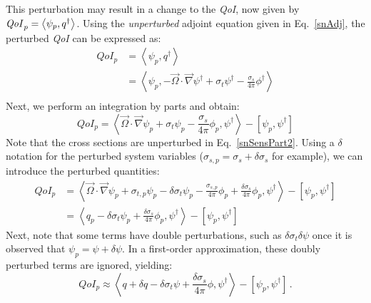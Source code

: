 \documentclass[12pt]{report}
\newcommand{\vO}{\vec{\Omega}}
\newcommand{\bra}{\left\langle}
\newcommand{\ket}{\right\rangle}
\newcommand{\sbra}{\left[}
\newcommand{\sket}{\right]}
\newcommand{\grad}{\vec{\nabla}}
\newcommand{\sigt}{\sigma_t}
\newcommand{\sigs}{\sigma_s}
\newcommand{\angResp}{q^\dag}
\newcommand{\qoi}{{\it QoI}\xspace}
\begin{document}
This perturbation may result in a change to the \qoi, now given by $\qoi_p=\bra \psi_p , \angResp \ket$. Using the {\it unperturbed} adjoint equation given in Eq.~\eqref{snAdj},
the perturbed \qoi can be expressed as:
\begin{equation}
\label{snSensPart}
\begin{split}
QoI_p &=\bra \psi_p , \angResp \ket \\
&=\bra \psi_p , - \vO \cdot \grad \psi^\dag + \sigt \psi^\dag - \frac{\sigs}{4 \pi} \phi^\dag  \ket \\
\end{split}
\end{equation}
Next, we perform an integration by parts and obtain:
\begin{equation}
\label{snSensPart2}
QoI_p = \bra  \vO \cdot \grad \psi_p + \sigt \psi_p - \frac{\sigs}{4 \pi} \phi_p , \psi^\dag  \ket - \sbra \psi_p, \psi^\dag \sket
\end{equation}
Note that the cross sections are unperturbed in Eq.~\eqref{snSensPart2}.
Using a $\delta$ notation for the perturbed system variables ($\sigma_{s,p} = \sigs + \delta \sigs$ for example), we
can introduce the perturbed quantities:
\begin{equation}
\label{snSensPart3}
\begin{split}
QoI_p &= \bra  \vO \cdot \grad \psi_p + \sigma_{t,p}\psi_p - \delta\sigt\psi_p - \frac{\sigma_{s,p}}{4 \pi} \phi_p
+\frac{\delta \sigs}{4 \pi} \phi_p
 , \psi^\dag  \ket - \sbra \psi_p, \psi^\dag \sket \\
 &= \bra  q_p - \delta\sigt\psi_p + \frac{\delta \sigs}{4 \pi} \phi_p
 , \psi^\dag  \ket - \sbra \psi_p, \psi^\dag \sket
\end{split}
\end{equation}
Next, note that some terms have double perturbations, such as $\delta \sigt \delta \psi$ once it is observed
that $\psi_p=\psi+\delta\psi$. 
In a first-order approximation, these doubly perturbed terms are ignored, yielding:
\begin{equation}
\label{snAdjQoI}
QoI_p \approx \bra  q + \delta q - \delta\sigt\psi + \frac{\delta \sigs}{4 \pi} \phi
 , \psi^\dag  \ket - \sbra \psi_p, \psi^\dag \sket \,.
\end{equation}
\end{document}
